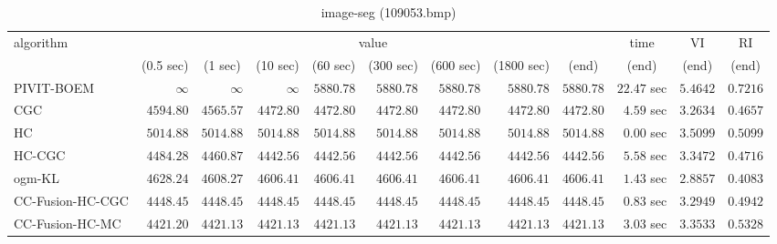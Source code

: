 \begin{table}[H]
\scriptsize
\centering
\caption{image-seg (109053.bmp)}
\label{tab:anytimetable-image-seg-109053.bmp}
\begin{tabular}{lrrrrrrrrrrr}
\toprule
           algorithm &                                   \multicolumn{8}{c}{value} & \multicolumn{1}{c}{time}    & \multicolumn{1}{c}{VI}  & \multicolumn{1}{c}{RI} \\  
\cmidrule(lr){2-9}\cmidrule(lr){10-10} \cmidrule(lr){11-11} \cmidrule(lr){12-12}   
                     & \multicolumn{1}{c}{(0.5 sec)} & \multicolumn{1}{c}{(1 sec)} & \multicolumn{1}{c}{(10 sec)} & \multicolumn{1}{c}{(60 sec)} & \multicolumn{1}{c}{(300 sec)} & \multicolumn{1}{c}{(600 sec)} & \multicolumn{1}{c}{(1800 sec)} & \multicolumn{1}{c}{(end)} & \multicolumn{1}{c}{(end)}    & \multicolumn{1}{c}{(end)}   & \multicolumn{1}{c}{(end)}  \\ \midrule 
          PIVIT-BOEM & $\infty$ & $\infty$ & $\infty$ & $      5880.78$ & $      5880.78$ & $      5880.78$ & $      5880.78$ & $      5880.78$ & $        22.47$ sec    & $       5.4642$  & $       0.7216$ \\ 
                 CGC & $      4594.80$ & $      4565.57$ & $      4472.80$ & $      4472.80$ & $      4472.80$ & $      4472.80$ & $      4472.80$ & $      4472.80$ & $         4.59$ sec    & $       3.2634$  & $       0.4657$ \\ 
                  HC & $      5014.88$ & $      5014.88$ & $      5014.88$ & $      5014.88$ & $      5014.88$ & $      5014.88$ & $      5014.88$ & $      5014.88$ & $         0.00$ sec    & $       3.5099$  & $       0.5099$ \\ 
              HC-CGC & $      4484.28$ & $      4460.87$ & $      4442.56$ & $      4442.56$ & $      4442.56$ & $      4442.56$ & $      4442.56$ & $      4442.56$ & $         5.58$ sec    & $       3.3472$  & $       0.4716$ \\ 
              ogm-KL & $      4628.24$ & $      4608.27$ & $      4606.41$ & $      4606.41$ & $      4606.41$ & $      4606.41$ & $      4606.41$ & $      4606.41$ & $         1.43$ sec    & $       2.8857$  & $       0.4083$ \\ 
    CC-Fusion-HC-CGC & $      4448.45$ & $      4448.45$ & $      4448.45$ & $      4448.45$ & $      4448.45$ & $      4448.45$ & $      4448.45$ & $      4448.45$ & $         0.83$ sec    & $       3.2949$  & $       0.4942$ \\ 
     CC-Fusion-HC-MC & $      4421.20$ & $      4421.13$ & $      4421.13$ & $      4421.13$ & $      4421.13$ & $      4421.13$ & $      4421.13$ & $      4421.13$ & $         3.03$ sec    & $       3.3533$  & $       0.5328$ \\ 

\end{tabular}
\end{table}
